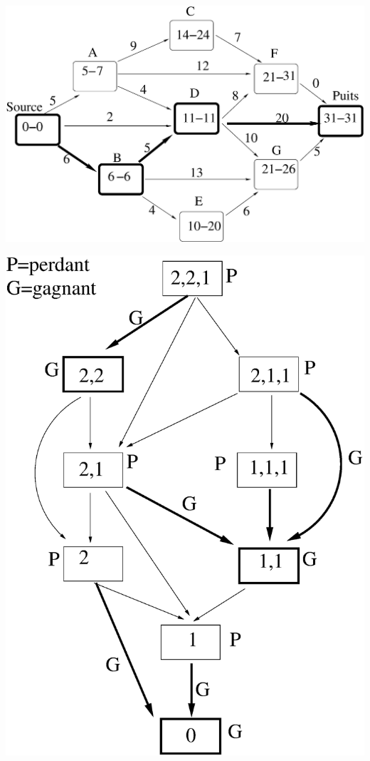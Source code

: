 \documentclass[11pt]{article}
\begin{document}
\newpage
\includegraphics[width=0.95\linewidth]{critique_solution.eps}

\includegraphics[width=0.6\linewidth]{nim.eps}
\end{document}

